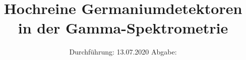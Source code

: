 

\subject{V 18}
\title{Hochreine Germaniumdetektoren in der Gamma-Spektrometrie}
\date{%
  Durchführung: 13.07.2020
  \hspace{3em}
  Abgabe: 
}



\maketitle
\thispagestyle{empty}
\tableofcontents
\newpage






\printbibliography{}


